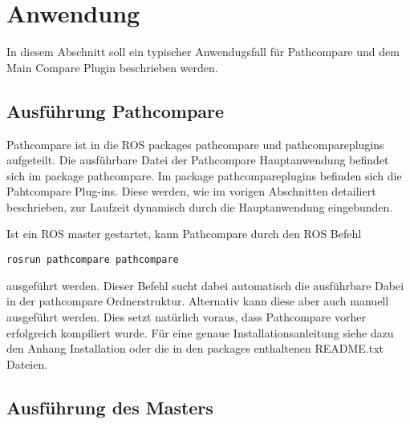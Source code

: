 \chapter{Anwendung}
\label{sec:andwendung}
In diesem Abschnitt soll ein typischer Anwendugsfall für Pathcompare und dem
Main Compare Plugin beschrieben werden. 

%

\section{Ausführung Pathcompare}

Pathcompare ist in die ROS packages pathcompare und pathcompareplugins
aufgeteilt. Die ausführbare Datei der Pathcompare Hauptanwendung befindet sich
im package pathcompare. Im package pathcompareplugins befinden sich die
Pahtcompare Plug-ins. Diese werden, wie im vorigen Abschnitten detailiert beschrieben, zur
Laufzeit dynamisch durch die Hauptanwendung eingebunden.

Ist ein ROS master gestartet, kann Pathcompare durch den ROS Befehl

\begin{lstlisting}[caption=starting pathcompare, label=lst:rosrun]
rosrun pathcompare pathcompare
\end{lstlisting}

ausgeführt werden.
Dieser Befehl sucht dabei automatisch die ausführbare Dabei in der pathcompare
Ordnerstruktur. Alternativ kann diese aber auch manuell ausgeführt werden.
Dies setzt natürlich voraus, dass Pathcompare vorher erfolgreich kompiliert
wurde. Für eine genaue Installationsanleitung siehe dazu den Anhang Installation
oder die in den packages enthaltenen README.txt Dateien.


\section{Ausführung des Masters}


